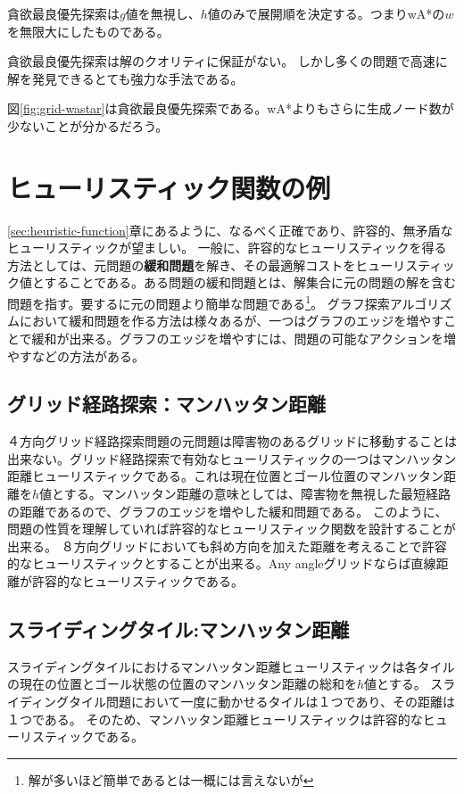 \documentclass[10pt]{book}
\begin{document}
貪欲最良優先探索は$g$値を無視し、$h$値のみで展開順を決定する。つまりwA*の$w$を無限大にしたものである。

貪欲最良優先探索は解のクオリティに保証がない。
しかし多くの問題で高速に解を発見できるとても強力な手法である。

図\ref{fig:grid-wastar}は貪欲最良優先探索である。wA*よりもさらに生成ノード数が少ないことが分かるだろう。


\section{ヒューリスティック関数の例}
\label{sec:heuristic-example}

\ref{sec:heuristic-function}章にあるように、なるべく正確であり、許容的、無矛盾なヒューリスティックが望ましい。
一般に、許容的なヒューリスティックを得る方法としては、元問題の{\bf 緩和問題}を解き、その最適解コストをヒューリスティック値とすることである。ある問題の緩和問題とは、解集合に元の問題の解を含む問題を指す。要するに元の問題より簡単な問題である\footnote{解が多いほど簡単であるとは一概には言えないが}。
グラフ探索アルゴリズムにおいて緩和問題を作る方法は様々あるが、一つはグラフのエッジを増やすことで緩和が出来る。グラフのエッジを増やすには、問題の可能なアクションを増やすなどの方法がある。

\subsection{グリッド経路探索：マンハッタン距離}

４方向グリッド経路探索問題の元問題は障害物のあるグリッドに移動することは出来ない。グリッド経路探索で有効なヒューリスティックの一つはマンハッタン距離ヒューリスティックである。これは現在位置とゴール位置のマンハッタン距離を$h$値とする。マンハッタン距離の意味としては、障害物を無視した最短経路の距離であるので、グラフのエッジを増やした緩和問題である。
このように、問題の性質を理解していれば許容的なヒューリスティック関数を設計することが出来る。
８方向グリッドにおいても斜め方向を加えた距離を考えることで許容的なヒューリスティックとすることが出来る。Any angleグリッドならば直線距離が許容的なヒューリスティックである。

\subsection{スライディングタイル:マンハッタン距離}
スライディングタイルにおけるマンハッタン距離ヒューリスティックは各タイルの現在の位置とゴール状態の位置のマンハッタン距離の総和を$h$値とする。
スライディングタイル問題において一度に動かせるタイルは１つであり、その距離は１つである。
そのため、マンハッタン距離ヒューリスティックは許容的なヒューリスティックである。
\end{document}
